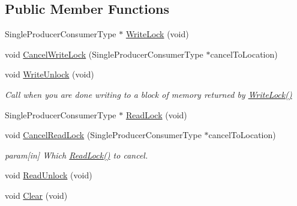\subsection*{Public Member Functions}
\begin{DoxyCompactItemize}
\item 
Single\-Producer\-Consumer\-Type $\ast$ \hyperlink{class_data_structures_1_1_single_producer_consumer_a875f6c2177c1ab29106472162b75c038}{Write\-Lock} (void)
\item 
void \hyperlink{class_data_structures_1_1_single_producer_consumer_adde3995822744b048b9e1df7a8bb02ff}{Cancel\-Write\-Lock} (Single\-Producer\-Consumer\-Type $\ast$cancel\-To\-Location)
\item 
\hypertarget{class_data_structures_1_1_single_producer_consumer_a2c5554a0297476b8f69e39b2721e1e23}{void \hyperlink{class_data_structures_1_1_single_producer_consumer_a2c5554a0297476b8f69e39b2721e1e23}{Write\-Unlock} (void)}\label{class_data_structures_1_1_single_producer_consumer_a2c5554a0297476b8f69e39b2721e1e23}

\begin{DoxyCompactList}\small\item\em Call when you are done writing to a block of memory returned by \hyperlink{class_data_structures_1_1_single_producer_consumer_a875f6c2177c1ab29106472162b75c038}{Write\-Lock()} \end{DoxyCompactList}\item 
Single\-Producer\-Consumer\-Type $\ast$ \hyperlink{class_data_structures_1_1_single_producer_consumer_a114026663fff4b0b5dac65f7b6b742c8}{Read\-Lock} (void)
\item 
\hypertarget{class_data_structures_1_1_single_producer_consumer_aa08c579304d9a91f96a4e285324864eb}{void \hyperlink{class_data_structures_1_1_single_producer_consumer_aa08c579304d9a91f96a4e285324864eb}{Cancel\-Read\-Lock} (Single\-Producer\-Consumer\-Type $\ast$cancel\-To\-Location)}\label{class_data_structures_1_1_single_producer_consumer_aa08c579304d9a91f96a4e285324864eb}

\begin{DoxyCompactList}\small\item\em param\mbox{[}in\mbox{]} Which \hyperlink{class_data_structures_1_1_single_producer_consumer_a114026663fff4b0b5dac65f7b6b742c8}{Read\-Lock()} to cancel. \end{DoxyCompactList}\item 
void \hyperlink{class_data_structures_1_1_single_producer_consumer_ab0440d6f877601c03b75deb1edbc94f6}{Read\-Unlock} (void)
\item 
\hypertarget{class_data_structures_1_1_single_producer_consumer_a78853698d03871f26074d1b13a2772a8}{void \hyperlink{class_data_structures_1_1_single_producer_consumer_a78853698d03871f26074d1b13a2772a8}{Clear} (void)}\label{class_data_structures_1_1_single_producer_consumer_a78853698d03871f26074d1b13a2772a8}


\end{DoxyCompactItemize}
